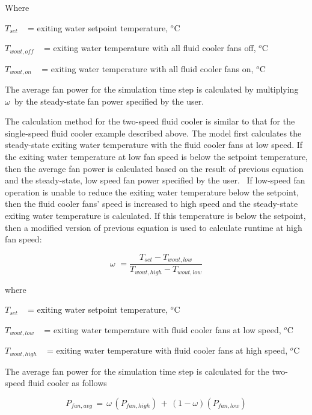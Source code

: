 Where

\({T_{set}}\) ~ = exiting water setpoint temperature, \(^{o}\)C

\({T_{wout,off}}\) ~ = exiting water temperature with all fluid cooler fans off, \(^{o}\)C

\({T_{wout,on}}\) ~ = exiting water temperature with all fluid cooler fans on, \(^{o}\)C

The average fan power for the simulation time step is calculated by multiplying \(\omega \,\) by the steady-state fan power specified by the user.

The calculation method for the two-speed fluid cooler is similar to that for the single-speed fluid cooler example described above. The model first calculates the steady-state exiting water temperature with the fluid cooler fans at low speed. If the exiting water temperature at low fan speed is below the setpoint temperature, then the average fan power is calculated based on the result of previous equation and the steady-state, low speed fan power specified by the user.~ If low-speed fan operation is unable to reduce the exiting water temperature below the setpoint, then the fluid cooler fans' speed is increased to high speed and the steady-state exiting water temperature is calculated. If this temperature is below the setpoint, then a modified version of previous equation is used to calculate runtime at high fan speed:

\begin{equation}
\omega \,\, = \frac{{{T_{set}} - {T_{wout,low}}}}{{{T_{wout,high}} - {T_{wout,low}}}}
\end{equation}

where

\({T_{set}}\) ~ = exiting water setpoint temperature, \(^{o}\)C

\({T_{wout,low}}\) ~ = exiting water temperature with fluid cooler fans at low speed, \(^{o}\)C

\({T_{wout,high}}\) ~ = exiting water temperature with fluid cooler fans at high speed, \(^{o}\)C

The average fan power for the simulation time step is calculated for the two-speed fluid cooler as follows

\begin{equation}
{P_{fan,avg}}\, = \,\omega \,({P_{fan,high}})\, + \,\left( {1 - \omega } \right)\left( {{P_{fan,low}}} \right)
\end{equation}
